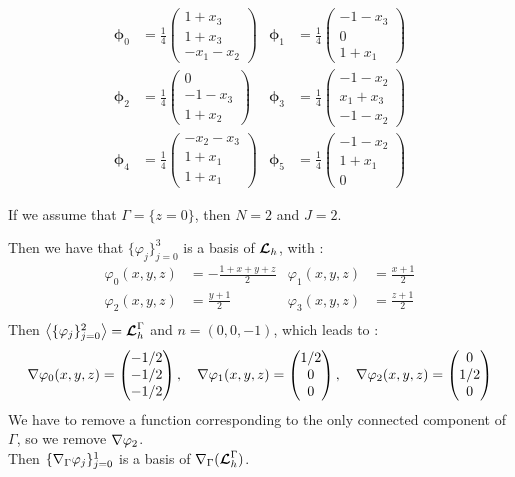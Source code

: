 \begin{align*}
\bm{\phi}_0 &= \frac{1}{4}\begin{pmatrix}1+x_3\\1+x_3\\-x_1-x_2\end{pmatrix} &
\bm{\phi}_1 &= \frac{1}{4}\begin{pmatrix}-1-x_3\\0\\1+x_1\end{pmatrix} \\
\bm{\phi}_2 &= \frac{1}{4}\begin{pmatrix}0\\-1-x_3\\1+x_2\end{pmatrix} &
\bm{\phi}_3 &= \frac{1}{4}\begin{pmatrix}-1-x_2\\x_1+x_3\\-1-x_2\end{pmatrix}\\
\bm{\phi}_4 &= \frac{1}{4}\begin{pmatrix}-x_2-x_3\\1+x_1\\1+x_1\end{pmatrix} &
\bm{\phi}_5 &= \frac{1}{4}\begin{pmatrix}-1-x_2\\1+x_1\\0\end{pmatrix}
\end{align*}

If we assume that $\Gamma=\{z=0\}$, then $N=2$ and $J=2$.

Then we have that $\{\varphi_j\}_{j=0}^3$ is a basis of ${\bm{\mathcal{L}}}_h$, with :
\begin{align*}
\varphi_0(x,y,z) &= -\frac{1+x+y+z}{2} &
\varphi_1(x,y,z) &= \frac{x+1}{2}\\
\varphi_2(x,y,z) &= \frac{y+1}{2} & \varphi_3(x,y,z) &= \frac{z+1}{2}\\
\end{align*}
Then $\left\langle\{\varphi_j\}_{j=0}^2\right\rangle={\bm{\mathcal{L}}}_h^\Gamma$ and
$n=(0,0,-1)$, which leads to :
\[
{\nabla} \varphi_0(x,y,z) = \begin{pmatrix}-1/2\\-1/2\\-1/2\end{pmatrix},\quad
{\nabla} \varphi_1(x,y,z) = \begin{pmatrix}1/2\\0\\0\end{pmatrix},\quad
{\nabla} \varphi_2(x,y,z) = \begin{pmatrix}0\\1/2\\0\end{pmatrix}
\]
We have to remove a function corresponding to the only connected component of
$\Gamma$, so we remove ${\nabla} \varphi_2$.\\
Then $\{{\nabla}_\Gamma \varphi_j\}_{j=0}^1$ is a basis of
${\nabla}_\Gamma({\bm{\mathcal{L}}}_h^\Gamma)$.\\

